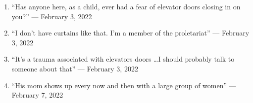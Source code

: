 \documentclass[12pt]{article}
\begin{document}
\begin{enumerate}
  \item “Has anyone here, as a child, ever had a fear of elevator doors closing in on you?” — February 3, 2022

  \item “I don't have curtains like that. I'm a member of the proletariat” — February 3, 2022

  \item “It's a trauma associated with elevators doors \dots I should probably talk to someone about that” — February 3, 2022

  \item “His mom shows up every now and then with a large group of women” — February 7, 2022
    
\end{enumerate}
\end{document}
